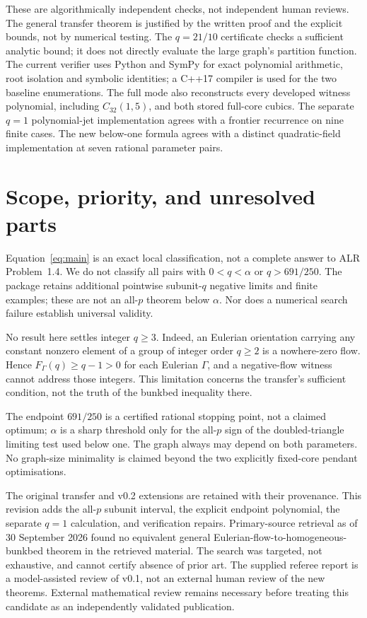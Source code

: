 \documentclass[11pt,a4paper]{article}
\theoremstyle{remark}\newtheorem{remark}[theorem]{Remark}
\begin{document}
These are algorithmically independent checks, not independent human reviews. The general transfer theorem is justified by the written proof and the explicit bounds, not by numerical testing. The $q=21/10$ certificate checks a sufficient analytic bound; it does not directly evaluate the large graph's partition function. The current verifier uses Python and SymPy for exact polynomial arithmetic, root isolation and symbolic identities; a C++17 compiler is used for the two baseline enumerations. The full mode also reconstructs every developed witness polynomial, including $C_{32}(1,5)$, and both stored full-core cubics. The separate $q=1$ polynomial-jet implementation agrees with a frontier recurrence on nine finite cases. The new below-one formula agrees with a distinct quadratic-field implementation at seven rational parameter pairs.

\section{Scope, priority, and unresolved parts}
Equation~\eqref{eq:main} is an exact local classification, not a complete answer to ALR Problem~1.4. We do not classify all pairs with $0<q<\alpha$ or $q>691/250$. The package retains additional pointwise subunit-$q$ negative limits and finite examples; these are not an all-$p$ theorem below $\alpha$. Nor does a numerical search failure establish universal validity.

No result here settles integer $q\ge3$. Indeed, an Eulerian orientation carrying any constant nonzero element of a group of integer order $q\ge2$ is a nowhere-zero flow. Hence $F_\Gamma(q)\ge q-1>0$ for each Eulerian $\Gamma$, and a negative-flow witness cannot address those integers. This limitation concerns the transfer's sufficient condition, not the truth of the bunkbed inequality there.

The endpoint $691/250$ is a certified rational stopping point, not a claimed optimum; $\alpha$ is a sharp threshold only for the all-$p$ sign of the doubled-triangle limiting test used below one. The graph always may depend on both parameters. No graph-size minimality is claimed beyond the two explicitly fixed-core pendant optimisations.

The original transfer and v0.2 extensions are retained with their provenance. This revision adds the all-$p$ subunit interval, the explicit endpoint polynomial, the separate $q=1$ calculation, and verification repairs. Primary-source retrieval as of 30 September 2026 found no equivalent general Eulerian-flow-to-homogeneous-bunkbed theorem in the retrieved material. The search was targeted, not exhaustive, and cannot certify absence of prior art. The supplied referee report is a model-assisted review of v0.1, not an external human review of the new theorems. External mathematical review remains necessary before treating this candidate as an independently validated publication.
\end{document}
